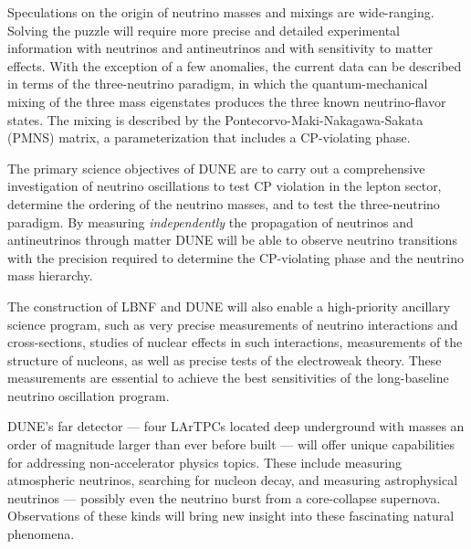 Speculations on the origin of neutrino masses and mixings are wide-ranging. 
Solving the puzzle will require more precise and detailed experimental information with neutrinos and antineutrinos and with sensitivity to matter effects. With the exception of a few anomalies, the current data can be described in terms of the three-neutrino paradigm, in which the 
quantum-mechanical mixing of the three mass eigenstates produces the three known neutrino-flavor states.  The mixing is described by the Pontecorvo-Maki-Nakagawa-Sakata (PMNS) matrix, a parameterization that includes a CP-violating phase. 

The primary science objectives %
of DUNE are to carry out a comprehensive investigation of neutrino oscillations to test CP violation in the lepton sector, determine the ordering of the neutrino masses, and to test the three-neutrino paradigm.
By measuring \textit{independently} the  propagation of neutrinos and antineutrinos through matter DUNE will be able to observe %
neutrino transitions with the precision required to determine the 
CP-violating phase and %
the neutrino mass hierarchy.

The construction of LBNF and DUNE will also enable a high-priority ancillary science program, such as 
very precise measurements of neutrino interactions and cross-sections, studies of nuclear effects in such interactions, measurements of the structure of nucleons, as well as precise tests of the electroweak theory. 
These measurements are essential to achieve the best sensitivities of the long-baseline neutrino oscillation program. %

DUNE's far detector --- four LArTPCs located deep underground with masses an order of magnitude larger than ever before built  ---  %
will offer unique capabilities for addressing %
non-accelerator physics topics. These include measuring atmospheric neutrinos, searching for nucleon decay, and measuring astrophysical neutrinos --- possibly even %
the neutrino burst %
from a core-collapse supernova. 
Observations of these kinds will bring new insight into these fascinating natural phenomena. 


